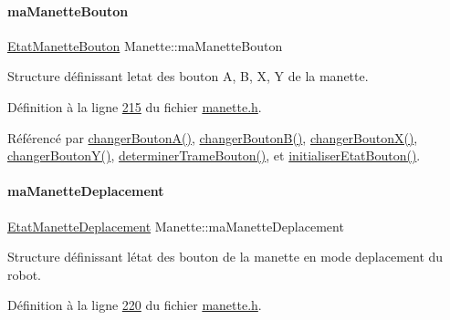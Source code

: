 \mbox{\label{class_manette_ae69fd9baa0dad8a960fa93611b6a185f}} 
\paragraph{\texorpdfstring{ma\+Manette\+Bouton}{maManetteBouton}}
{\footnotesize\ttfamily \hyperlink{struct_etat_manette_bouton}{Etat\+Manette\+Bouton} Manette\+::ma\+Manette\+Bouton\hspace{0.3cm}{\ttfamily [private]}}



Structure définissant l\textquotesingle{}etat des bouton A, B, X, Y de la manette. 



Définition à la ligne \hyperlink{manette_8h_source_l00215}{215} du fichier \hyperlink{manette_8h_source}{manette.\+h}.



Référencé par \hyperlink{manette_8cpp_source_l00551}{changer\+Bouton\+A()}, \hyperlink{manette_8cpp_source_l00558}{changer\+Bouton\+B()}, \hyperlink{manette_8cpp_source_l00565}{changer\+Bouton\+X()}, \hyperlink{manette_8cpp_source_l00572}{changer\+Bouton\+Y()}, \hyperlink{manette_8cpp_source_l00393}{determiner\+Trame\+Bouton()}, et \hyperlink{manette_8cpp_source_l00313}{initialiser\+Etat\+Bouton()}.

\mbox{\label{class_manette_af3d0f304c4c33e02bdf34fc99aa4dbff}} 
\paragraph{\texorpdfstring{ma\+Manette\+Deplacement}{maManetteDeplacement}}
{\footnotesize\ttfamily \hyperlink{struct_etat_manette_deplacement}{Etat\+Manette\+Deplacement} Manette\+::ma\+Manette\+Deplacement\hspace{0.3cm}{\ttfamily [private]}}



Structure définissant l\textquotesingle{}état des bouton de la manette en mode deplacement du robot. 



Définition à la ligne \hyperlink{manette_8h_source_l00220}{220} du fichier \hyperlink{manette_8h_source}{manette.\+h}.



